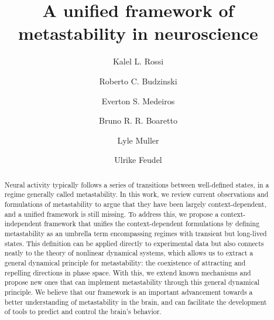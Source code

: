 \documentclass[reprint,superscriptaddress,showpacs,amsmath,amssymb,aps,floatfix,nolongbibliography]{revtex4-2}
\theoremstyle{definition}
\begin{document}
\title{A unified framework of metastability in neuroscience}
\author{Kalel L. Rossi}
\author{Roberto C. Budzinski}
\author{Everton S. Medeiros}
\author{Bruno R. R. Boaretto}
\author{Lyle Muller}
\author{Ulrike Feudel}


\begin{abstract}
Neural activity typically follows a series of transitions between well-defined states, in a regime generally called metastability. In this work, we review current observations and formulations of metastability to argue that they have been largely context-dependent, and a unified framework is still missing. To address this, we propose a context-independent framework that unifies the context-dependent formulations by defining metastability as an umbrella term encompassing regimes with transient but long-lived states. This definition can be applied directly to experimental data but also connects neatly to the theory of nonlinear dynamical systems, which allows us to extract a general dynamical principle for metastability: the coexistence of attracting and repelling directions in phase space. With this, we extend known mechanisms and propose new ones that can implement metastability through this general dynamical principle. We believe that our framework is an important advancement towards a better understanding of metastability in the brain, and can facilitate the development of tools to predict and control the brain's behavior. 
\end{abstract} 
\end{document}
